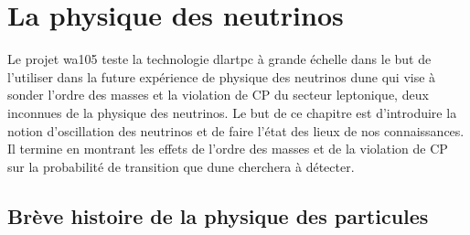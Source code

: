 


\chapter{La physique des neutrinos}\label{chap::1}

  Le projet \gls{wa105} teste la technologie \gls{dlartpc} à grande échelle dans le but de l'utiliser dans la future expérience de physique des neutrinos \gls{dune} qui vise à sonder l'ordre des masses et la violation de CP du secteur leptonique, deux inconnues de la physique des neutrinos. Le but de ce chapitre est d'introduire la notion d'oscillation des neutrinos et de faire l'état des lieux de nos connaissances. Il termine en montrant les effets de l'ordre des masses et de la violation de CP sur la probabilité de transition que \gls{dune} cherchera à détecter.
    
  \section{Brève histoire de la physique des particules}
    	    

